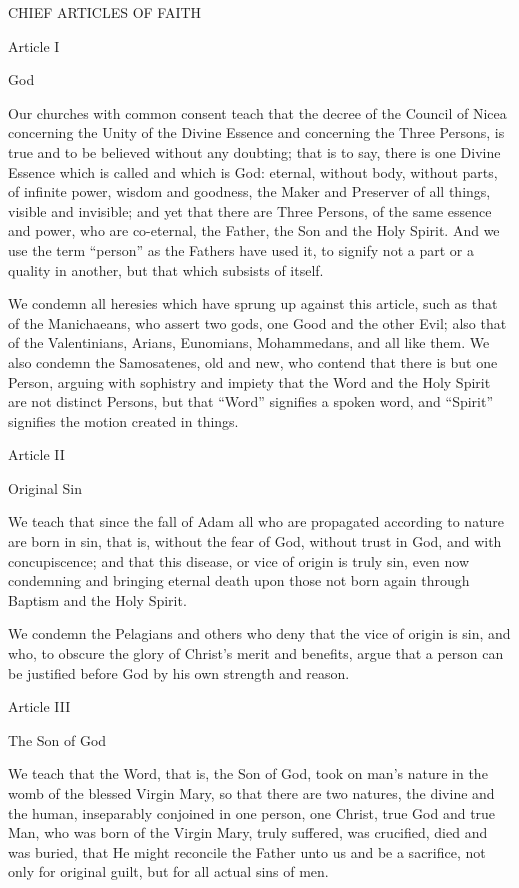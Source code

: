  

 

CHIEF ARTICLES OF FAITH

Article I

God

Our churches with common consent teach that the decree of the Council of Nicea concerning the Unity of the Divine Essence and concerning the Three Persons, is true and to be believed without any doubting; that is to say, there is one Divine Essence which is called and which is God: eternal, without body, without parts, of infinite power, wisdom and goodness, the Maker and Preserver of all things, visible and invisible; and yet that there are Three Persons, of the same essence and power, who are co-eternal, the Father, the Son and the Holy Spirit. And we use the term “person” as the Fathers have used it, to signify not a part or a quality in another, but that which subsists of itself.

We condemn all heresies which have sprung up against this article, such as that of the Manichaeans, who assert two gods, one Good and the other Evil; also that of the Valentinians, Arians, Eunomians, Mohammedans, and all like them. We also condemn the Samosatenes, old and new, who contend that there is but one Person, arguing with sophistry and impiety that the Word and the Holy Spirit are not distinct Persons, but that “Word” signifies a spoken word, and “Spirit” signifies the motion created in things.

 

Article II

Original Sin

We teach that since the fall of Adam all who are propagated according to nature are born in sin, that is, without the fear of God, without trust in God, and with concupiscence; and that this disease, or vice of origin is truly sin, even now condemning and bringing eternal death upon those not born again through Baptism and the Holy Spirit.

We condemn the Pelagians and others who deny that the vice of origin is sin, and who, to obscure the glory of Christ’s merit and benefits, argue that a person can be justified before God by his own strength and reason.

 

Article III

The Son of God

We teach that the Word, that is, the Son of God, took on man’s nature in the womb of the blessed Virgin Mary, so that there are two natures, the divine and the human, inseparably conjoined in one person, one Christ, true God and true Man, who was born of the Virgin Mary, truly suffered, was crucified, died and was buried, that He might reconcile the Father unto us and be a sacrifice, not only for original guilt, but for all actual sins of men.

